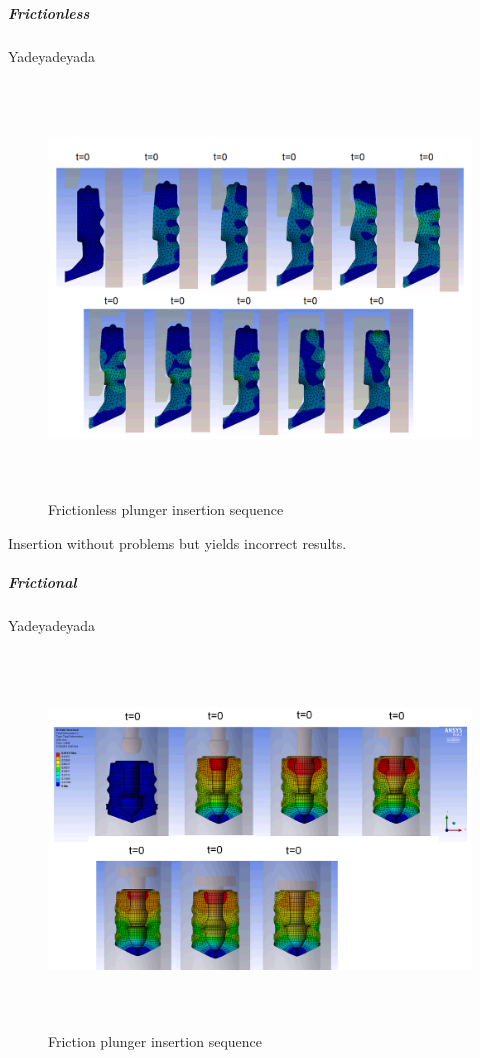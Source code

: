 \subparagraph{Frictionless}
Yadeyadeyada
\begin{figure}[h!]	
	\centering
\includegraphics[height=11cm]{img/fricless.PNG}
   \caption{Frictionless plunger insertion sequence}
 \label{fgr:PFS}
\end{figure}

Insertion without problems but yields incorrect results.
\newpage
\subparagraph{Frictional}
Yadeyadeyada

\begin{figure}[h]	
	\centering
\includegraphics[height=10cm]{img/fric.PNG}
   \caption{Friction plunger insertion sequence}
 \label{fgr:PFS}
\end{figure}

